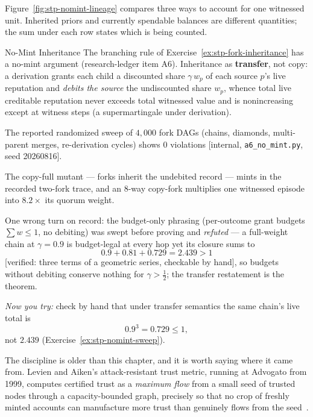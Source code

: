 \documentclass[11pt,a4paper]{article}
\theoremstyle{definition}
\begin{document}
\pdexercisepointer*{\ref{ex:stp-connected-vs-continuous}}{\ref{ex:stp-fork-inheritance}}{\pageref{ex:stp-connected-vs-continuous}}

Figure~\ref{fig:stp-nomint-lineage} compares three ways to account for one
witnessed unit. Inherited priors and currently spendable balances are different
quantities; the sum under each row states which is being counted.


\FloatBarrier
\pdmarginpagebreak

\begin{pdexample}{No-Mint Inheritance}
\setlength{\parskip}{4pt plus 1pt}
The branching rule of Exercise~\ref{ex:stp-fork-inheritance} has a
no-mint argument (research-ledger item A6). Inheritance as
\textbf{transfer}, not copy: a derivation grants each child a discounted share
$\gamma\,w_p$ of each source $p$'s live reputation and \emph{debits the
source} the undiscounted share $w_p$, whence total live creditable reputation
never exceeds total witnessed value and is nonincreasing except at witness
steps (a supermartingale under derivation).

The reported randomized sweep of $4{,}000$
fork DAGs (chains, diamonds, multi-parent merges, re-derivation cycles) shows
$0$ violations [internal, \texttt{a6\_no\_mint.py}, seed 20260816].

The copy-full mutant --- forks inherit the undebited record --- mints in the
recorded two-fork trace, and an 8-way copy-fork multiplies one witnessed
episode into $8.2\times$ its quorum weight.

One wrong turn on record: the
budget-only phrasing (per-outcome grant budgets $\sum w \le 1$, no debiting)
was swept before proving and \emph{refuted} --- a full-weight chain at
$\gamma=0.9$ is budget-legal at every hop yet its closure sums to
\[
0.9+0.81+0.729=2.439>1
\]
[verified: three terms of a geometric series, checkable
by hand], so budgets without debiting conserve nothing for $\gamma>\tfrac12$;
the transfer restatement is the theorem.

\emph{Now you try:} check by hand
that under transfer semantics the same chain's live total is
\[
0.9^3=0.729\le 1,
\]
not $2.439$ (Exercise~\ref{ex:stp-nomint-sweep}).

The discipline is older than this chapter, and it is worth saying where it
came from. Levien and Aiken's attack-resistant trust metric, running at
Advogato from 1999, computes certified trust as a \emph{maximum flow} from a
small seed of trusted nodes through a capacity-bounded graph, precisely so
that no crop of freshly minted accounts can manufacture more trust than
genuinely flows from the seed~.


\end{pdexample}
\end{document}
